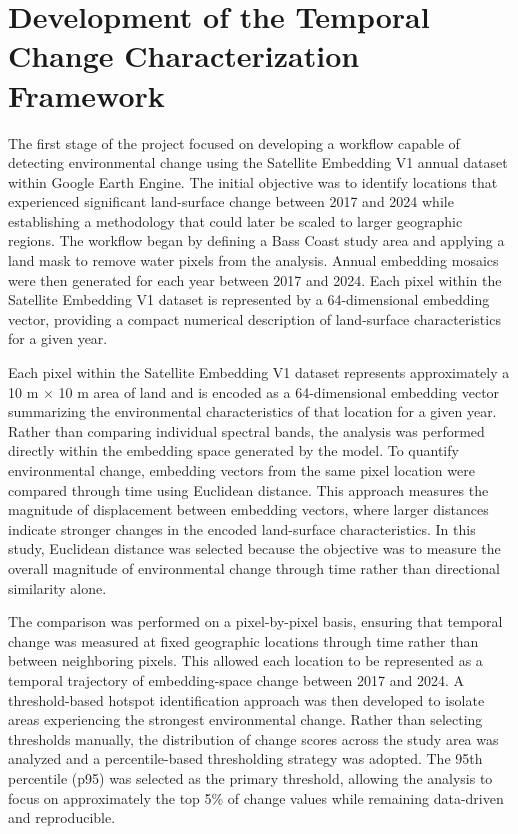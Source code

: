\documentclass[11pt,a4paper]{article}
\begin{document}
\section{Development of the Temporal Change Characterization Framework}

The first stage of the project focused on developing a workflow capable of detecting environmental change using the Satellite Embedding V1 annual dataset within Google Earth Engine. The initial objective was to identify locations that experienced significant land-surface change between 2017 and 2024 while establishing a methodology that could later be scaled to larger geographic regions. The workflow began by defining a Bass Coast study area and applying a land mask to remove water pixels from the analysis. Annual embedding mosaics were then generated for each year between 2017 and 2024. Each pixel within the Satellite Embedding V1 dataset is represented by a 64-dimensional embedding vector, providing a compact numerical description of land-surface characteristics for a given year.

Each pixel within the Satellite Embedding V1 dataset represents approximately a 10 m $\times$ 10 m area of land and is encoded as a 64-dimensional embedding vector summarizing the environmental characteristics of that location for a given year. Rather than comparing individual spectral bands, the analysis was performed directly within the embedding space generated by the model. To quantify environmental change, embedding vectors from the same pixel location were compared through time using Euclidean distance. This approach measures the magnitude of displacement between embedding vectors, where larger distances indicate stronger changes in the encoded land-surface characteristics. In this study, Euclidean distance was selected because the objective was to measure the overall magnitude of environmental change through time rather than directional similarity alone.

The comparison was performed on a pixel-by-pixel basis, ensuring that temporal change was measured at fixed geographic locations through time rather than between neighboring pixels. This allowed each location to be represented as a temporal trajectory of embedding-space change between 2017 and 2024. A threshold-based hotspot identification approach was then developed to isolate areas experiencing the strongest environmental change. Rather than selecting thresholds manually, the distribution of change scores across the study area was analyzed and a percentile-based thresholding strategy was adopted. The 95th percentile (p95) was selected as the primary threshold, allowing the analysis to focus on approximately the top 5\% of change values while remaining data-driven and reproducible.
\end{document}
